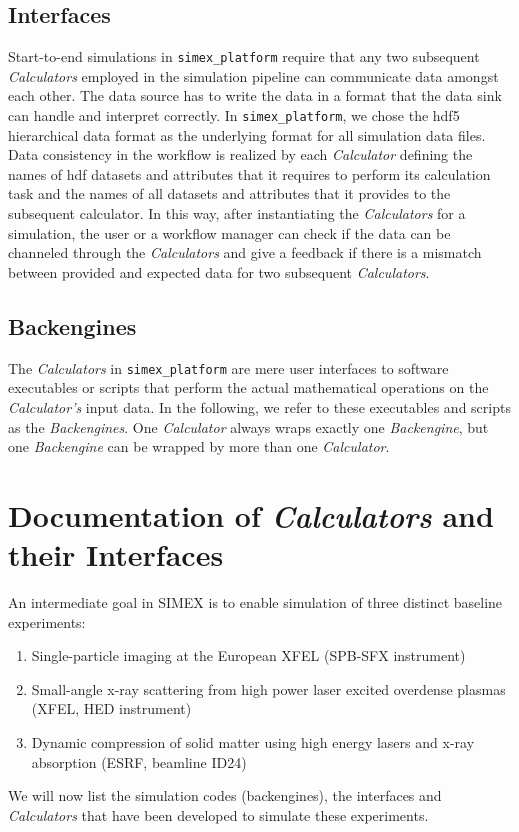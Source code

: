 \documentclass[12pt]{scrartcl}
\begin{document}
\subsection{Interfaces}
Start-to-end simulations in \texttt{simex\_platform} require that any two
subsequent \textit{Calculators} employed in the simulation pipeline can
communicate data amongst each other. The data source has to write the data in a
format that the data sink can handle and interpret correctly. In
\texttt{simex\_platform}, we chose the hdf5 \cite{hdf5} hierarchical data format
as the underlying format for all simulation data files. Data consistency in the
workflow is realized by each \textit{Calculator} defining the names of hdf
datasets and attributes that it requires to perform its calculation task and the
names of all datasets and attributes that it provides to the subsequent
calculator. In this way, after instantiating the \textit{Calculators} for a
simulation, the user or a workflow manager can check if the data can be
channeled through the \textit{Calculators} and give a feedback if there is a
mismatch between provided and expected data for two subsequent
\textit{Calculators}.


\subsection{Backengines}
The \textit{Calculators} in \texttt{simex\_platform} are mere user interfaces to
software executables or scripts that perform the actual mathematical operations on the
\textit{Calculator's} input data. In the following, we refer to these
executables and scripts as the \textit{Backengines}. One \textit{Calculator}
always wraps exactly one \textit{Backengine}, but one \textit{Backengine} can be
wrapped by more than one \textit{Calculator}.

\section{Documentation of \textit{Calculators} and their Interfaces}

An intermediate goal in SIMEX is to enable simulation of three distinct baseline
experiments:
\begin{enumerate}
  \item Single-particle imaging at the European XFEL (SPB-SFX instrument)
  \item Small-angle x-ray scattering from high power laser excited overdense
    plasmas (XFEL, HED instrument)
  \item Dynamic compression of solid matter using high energy lasers and x-ray
    absorption (ESRF, beamline ID24)
\end{enumerate}
We will now list the simulation codes (backengines), the interfaces and
\textit{Calculators} that have been developed to simulate these experiments.
\end{document}
